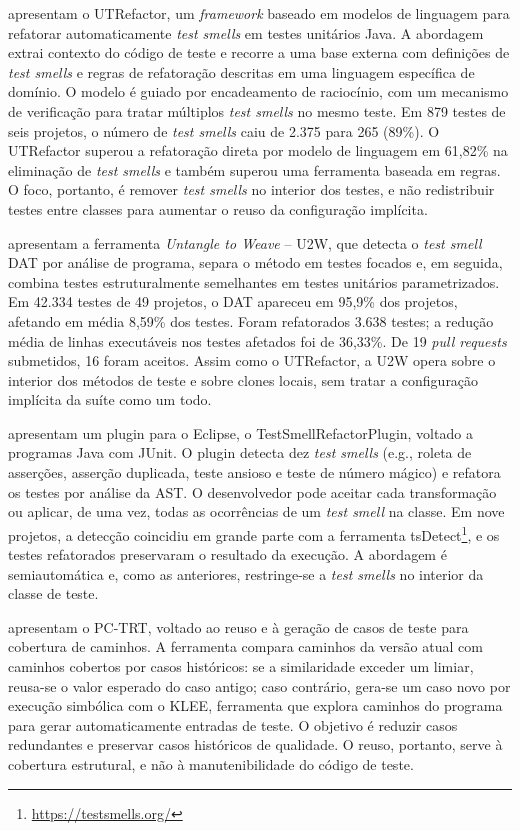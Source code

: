  apresentam o UTRefactor, um \textit{framework} baseado em modelos de linguagem para refatorar automaticamente \textit{test smells} em testes unitários Java. A abordagem extrai contexto do código de teste e recorre a uma base externa com definições de \textit{test smells} e regras de refatoração descritas em uma linguagem específica de domínio. O modelo é guiado por encadeamento de raciocínio, com um mecanismo de verificação para tratar múltiplos \textit{test smells} no mesmo teste. Em 879 testes de seis projetos, o número de \textit{test smells} caiu de 2.375 para 265 (89\%). O UTRefactor superou a refatoração direta por modelo de linguagem em 61,82\% na eliminação de \textit{test smells} e também superou uma ferramenta baseada em regras. O foco, portanto, é remover \textit{test smells} no interior dos testes, e não redistribuir testes entre classes para aumentar o reuso da configuração implícita.

 apresentam a ferramenta \textit{Untangle to Weave} -- U2W, que detecta o \textit{test smell} DAT por análise de programa, separa o método em testes focados e, em seguida, combina testes estruturalmente semelhantes em testes unitários parametrizados. Em 42.334 testes de 49 projetos, o DAT apareceu em 95,9\% dos projetos, afetando em média 8,59\% dos testes. Foram refatorados 3.638 testes; a redução média de linhas executáveis nos testes afetados foi de 36,33\%. De 19 \textit{pull requests} submetidos, 16 foram aceitos. Assim como o UTRefactor, a U2W opera sobre o interior dos métodos de teste e sobre clones locais, sem tratar a configuração implícita da suíte como um todo.

 apresentam um plugin para o Eclipse, o TestSmellRefactorPlugin, voltado a programas Java com JUnit. O plugin detecta dez \textit{test smells} (e.g., roleta de asserções, asserção duplicada, teste ansioso e teste de número mágico) e refatora os testes por análise da AST. O desenvolvedor pode aceitar cada transformação ou aplicar, de uma vez, todas as ocorrências de um \textit{test smell} na classe. Em nove projetos, a detecção coincidiu em grande parte com a ferramenta tsDetect\footnote{\url{https://testsmells.org/}}, e os testes refatorados preservaram o resultado da execução. A abordagem é semiautomática e, como as anteriores, restringe-se a \textit{test smells} no interior da classe de teste.

 apresentam o PC-TRT, voltado ao reuso e à geração de casos de teste para cobertura de caminhos. A ferramenta compara caminhos da versão atual com caminhos cobertos por casos históricos: se a similaridade exceder um limiar, reusa-se o valor esperado do caso antigo; caso contrário, gera-se um caso novo por execução simbólica com o KLEE, ferramenta que explora caminhos do programa para gerar automaticamente entradas de teste. O objetivo é reduzir casos redundantes e preservar casos históricos de qualidade. O reuso, portanto, serve à cobertura estrutural, e não à manutenibilidade do código de teste.

